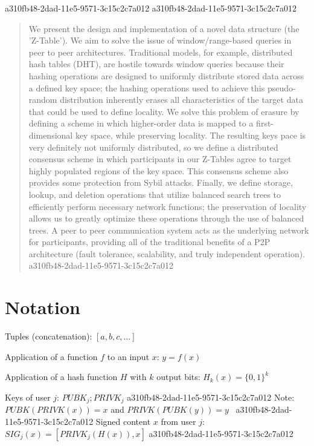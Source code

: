 \documentclass[12pt]{article}
\begin{document}
\maketitle
a310fb48-2dad-11e5-9571-3c15c2c7a012
a310fb48-2dad-11e5-9571-3c15c2c7a012\begin{abstract}
We present the design and implementation of a novel data structure (the 'Z-Table'). We aim to solve the issue of window/range-based queries in peer to peer architectures. Traditional models, for example,  distributed hash tables (DHT), are hostile towards window queries because their hashing operations are designed to uniformly distribute stored data across a defined key space; the hashing operations used to achieve this pseudo-random distribution inherently erases all characteristics of the target data that could be used to define locality. We solve this problem of erasure by defining a scheme in which higher-order data is mapped to a first-dimensional key space, while preserving locality. The resulting keys pace is very definitely not uniformly distributed, so we define a distributed consensus scheme in which participants in our Z-Tables agree to target highly populated regions of the key space. This consensus scheme also provides some protection from Sybil attacks. Finally, we define storage, lookup, and deletion operations that utilize balanced search trees to efficiently perform necessary network functions; the preservation of locality allows us to greatly optimize these operations through the use of balanced trees. A peer to peer communication system acts as the underlying network for participants, providing all of the traditional benefits of a P2P architecture (fault tolerance, scalability, and truly independent operation).
a310fb48-2dad-11e5-9571-3c15c2c7a012\end{abstract}

\section{Notation}

Tuples (concatenation): $[a,b,c,...]$

Application of a function $f$ to an input $x$: $y=f(x)$

Application of a hash function $H$ with $k$ output bits: $H_{k}(x) = \{0,1\}^k$

Keys of user $j$: $ PUBK_j; PRIVK_j $
a310fb48-2dad-11e5-9571-3c15c2c7a012
Note: $PUBK(PRIVK(x)) = x$ and $PRIVK(PUBK(y)) = y$~
a310fb48-2dad-11e5-9571-3c15c2c7a012
Signed content $x$ from user $j$: $SIG_j(x) = \left[ PRIVK_j( H(x) ), x \right]$
a310fb48-2dad-11e5-9571-3c15c2c7a012
\end{document}
